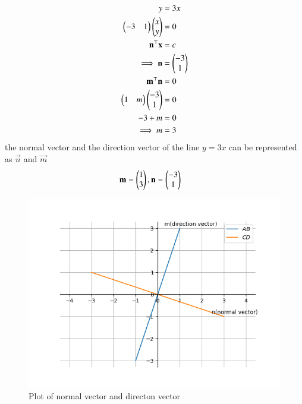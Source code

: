\documentclass[journal]{IEEEtran}
\begin{document}
\solution \\
\begin{align}
	y&=3x\\
	\begin{pmatrix}-3 & 1\end{pmatrix}\begin{pmatrix}x\\y\end{pmatrix}&=0\\
	\mathbf{n}^\top \mathbf{x} &=c\\
	\implies \mathbf{n}&=\begin{pmatrix}-3\\ 1\end{pmatrix}\\
	\mathbf{m}^\top \mathbf{n} &= 0\\
	\begin{pmatrix}1 & m\end{pmatrix}\begin{pmatrix}-3 \\ 1\end{pmatrix}&=0\\
	-3+m &=0\\
	\implies m &= 3
\end{align}
the normal vector and the direction vector of the line $y=3x$ can be represented as $\vec{n}$ and $\vec{m}$\\
\begin{align}
	\mathbf{m} &= \begin{pmatrix}1\\3\end{pmatrix},\mathbf{n} = \begin{pmatrix}-3\\1\end{pmatrix}
\end{align}
\begin{figure}[h!]
                \centering
               \includegraphics[width=0.7\linewidth]{Figs/Fig1.png}
			\caption{Plot of normal vector and directon vector}
               \label{stemplot}
               \end{figure}
\end{document}

